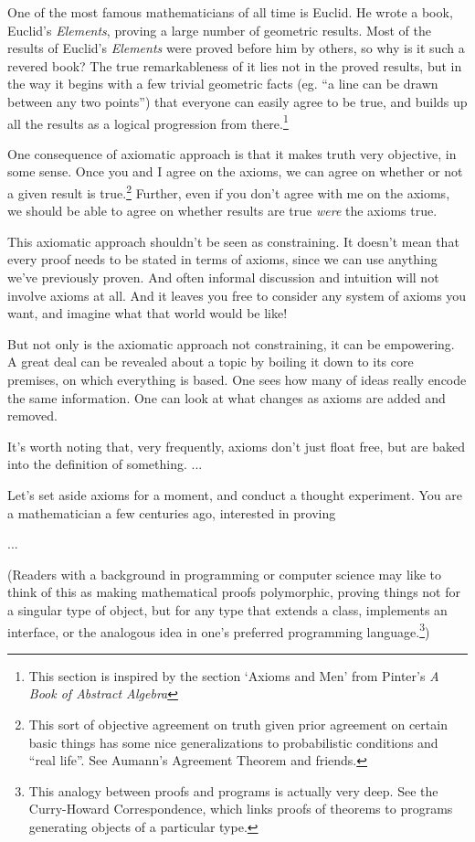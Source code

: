 \documentclass{report}
\begin{document}
One of the most famous mathematicians of all time is Euclid. He wrote a book, Euclid's \emph{Elements}, proving a large number of geometric results. Most of the results of Euclid's \emph{Elements} were proved before him by others, so why is it such a revered book? The true remarkableness of it lies not in the proved results, but in the way it begins with a few trivial geometric facts (eg. ``a line can be drawn between any two points'') that everyone can easily agree to be true, and builds up all the results as a logical progression from there.\footnote{This section is inspired by the section `Axioms and Men' from Pinter's \emph{A Book of Abstract Algebra}}

One consequence of axiomatic approach is that it makes truth very objective, in some sense. Once you and I agree on the axioms, we can agree on whether or not a given result is true.\footnote{This sort of objective agreement on truth given prior agreement on certain basic things has some nice generalizations to probabilistic conditions and ``real life''. See Aumann's Agreement Theorem and friends.} Further, even if you don't agree with me on the axioms, we should be able to agree on whether results are true \emph{were} the axioms true.

This axiomatic approach shouldn't be seen as constraining. It doesn't mean that every proof needs to be stated in terms of axioms, since we can use anything we've previously proven. And often informal discussion and intuition will not involve axioms at all. And it leaves you free to consider any system of axioms you want, and imagine what that world would be like!

But not only is the axiomatic approach not constraining, it can be empowering. A great deal can be revealed about a topic by boiling it down to its core premises, on which everything is based. One sees how many of ideas really encode the same information. One can look at what changes as axioms are added and removed.

It's worth noting that, very frequently, axioms don't just float free, but are baked into the definition of something. ...

Let's set aside axioms for a moment, and conduct a thought experiment. You are a mathematician a few centuries ago, interested in proving 


... 

(Readers with a background in programming or computer science may like to think of this as making mathematical proofs polymorphic, proving things not for a singular type of object, but for any type that extends a class, implements an interface, or the analogous idea in one's preferred programming language.\footnote{This analogy between proofs and programs is actually very deep. See the Curry-Howard Correspondence, which links proofs of theorems to programs generating objects of a particular type.})
\end{document}
